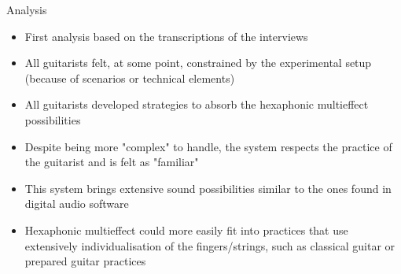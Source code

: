 \documentclass[final]{beamer}
\newlength{\onecolwid}
\begin{document}
\begin{frame}[t]
\begin{columns}[t]
\begin{column}{\onecolwid}
\begin{block}{Analysis}
\begin{itemize}
    \item First analysis based on the transcriptions of the interviews
    \item All guitarists felt, at some point, constrained by the experimental setup (because of scenarios or technical elements) 
    \item All guitarists developed strategies to absorb the hexaphonic multieffect possibilities
    \item Despite being more "complex" to handle, the system respects the practice of the guitarist and is felt as "familiar" 
    \item This system brings extensive sound possibilities similar to the ones found in digital audio software
    \item Hexaphonic multieffect could more easily fit into practices that use extensively individualisation of the fingers/strings, such as classical guitar or prepared guitar practices
\end{itemize}


    


\end{block}
\end{column}
\end{columns}
\end{frame}
\end{document}
